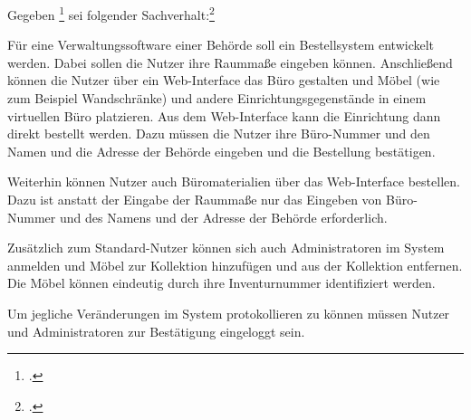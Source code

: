 \documentclass{bschlangaul-aufgabe}
\begin{document}

Gegeben \footcite{examen:46116:2014:09} sei
folgender Sachverhalt:\footcite{sosy:pu:2}

Für eine Verwaltungssoftware einer Behörde soll ein Bestellsystem
entwickelt werden. Dabei sollen die Nutzer ihre Raummaße eingeben
können. Anschließend können die Nutzer über ein Web-Interface das Büro
gestalten und Möbel (wie zum Beispiel Wandschränke) und andere
Einrichtungsgegenstände in einem virtuellen Büro platzieren. Aus dem
Web-Interface kann die Einrichtung dann direkt bestellt werden. Dazu
müssen die Nutzer ihre Büro-Nummer und den Namen und die Adresse der
Behörde eingeben und die Bestellung bestätigen.

Weiterhin können Nutzer auch Büromaterialien über das Web-Interface
bestellen. Dazu ist anstatt der Eingabe der Raummaße nur das Eingeben
von Büro-Nummer und des Namens und der Adresse der Behörde erforderlich.

Zusätzlich zum Standard-Nutzer können sich auch Administratoren im
System anmelden und Möbel zur Kollektion hinzufügen und aus der
Kollektion entfernen. Die Möbel können eindeutig durch ihre
Inventurnummer identifiziert werden.

Um jegliche Veränderungen im System protokollieren zu können müssen
Nutzer und Administratoren zur Bestätigung eingeloggt sein.
\end{document}
